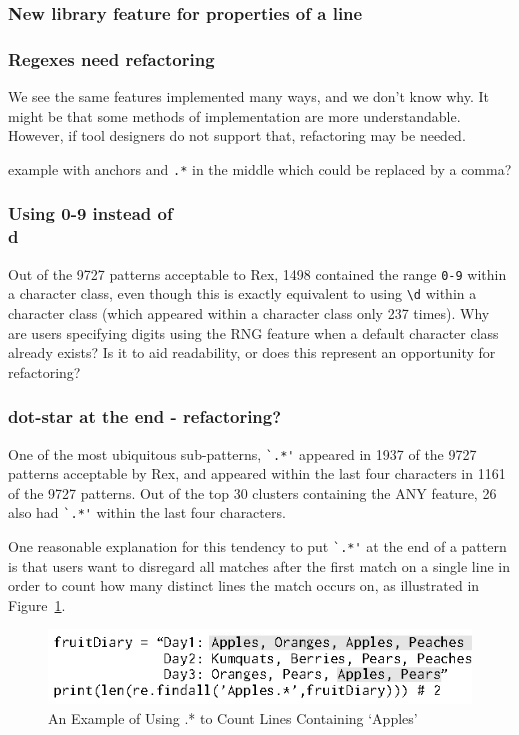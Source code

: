 \subsubsection{New library feature for properties of a line}

\subsubsection{Regexes need refactoring}
We see the same features implemented many ways, and we don't know why. It might be that some methods of implementation are more understandable. However, if tool designers do not support that, refactoring may be needed.

example with anchors and {\tt .*} in the middle which could be replaced by a comma?

\subsubsection{Using 0-9 instead of \\d}
Out of the 9727 patterns acceptable to Rex, 1498 contained the range \verb•0-9• within a character class, even though this is exactly equivalent to using \verb•\d• within a character class (which appeared within a character class only 237 times).  Why are users specifying digits using the RNG feature when a default character class already exists?  Is it to aid readability, or does this represent an opportunity for refactoring?

\subsubsection{dot-star at the end - refactoring?}
One of the most ubiquitous sub-patterns, \verb!`.*'! appeared in 1937 of the 9727 patterns acceptable by Rex, and appeared within the last four characters in 1161 of the 9727 patterns.  Out of the top 30 clusters containing the ANY feature, 26 also had \verb!`.*'! within the last four characters.

One reasonable explanation for this tendency to put \verb!`.*'! at the end of a pattern is that users want to disregard all matches after the first match on a single line in order to count how many distinct lines the match occurs on, as illustrated in Figure~\ref{fig:lineSearch}.

\begin{figure}[htb]
\centering
\includegraphics[width=\columnwidth]{../illustrations/lineSearch.eps}
\caption{An Example of Using .* to Count Lines Containing `Apples'}
\label{fig:lineSearch}
\end{figure}

